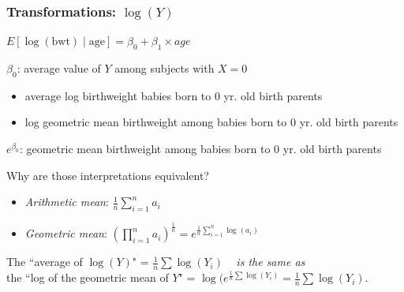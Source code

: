 \documentclass[10pt,t]{beamer}
\begin{document}
\begin{frame}
\frametitle{Transformations: $\log(Y)$}
\begin{center} $E[\log(\text{bwt}) \mid \text{age}] = \beta_0 + \beta_1 \times age$ \end{center}
$\beta_0$: average value of $Y$ among subjects with $X = 0$\\ \pause
\begin{itemize}
	\item[] average log birthweight babies born to 0 yr. old birth parents  \pause
	\item[] log geometric mean birthweight among babies born to 0 yr. old birth parents \pause
\end{itemize}
\color{blue} $e^{\beta_0}$: geometric mean birthweight among babies born to 0 yr. old birth parents \color{black}\pause
\vspace{0.3cm}

Why are those interpretations equivalent?
\begin{itemize}
	\item[] \textit{Arithmetic mean}: $\frac{1}{n} \sum_{i=1}^n a_i$
	\item[] \textit{Geometric mean}: $\left(\prod_{i=1}^n a_i\right)^{\frac{1}{n}} = e^{\frac{1}{n} \sum_{i=1}^n \log(a_i)}$
\end{itemize}

\vspace{0.3cm}

\begin{footnotesize}The \color{blue} ``average of $\log(Y)$" \color{black} = $\frac{1}{n}\sum \log(Y_i)$ \ \color{blue} \textit{is the same as} \color{black}\\the \color{blue}``log of the geometric mean of $Y$" \color{black}= $\log(e^{\frac{1}{n}\sum \log(Y_i)} = \frac{1}{n}\sum \log(Y_i)$.\end{footnotesize}
\end{frame}
\end{document}
